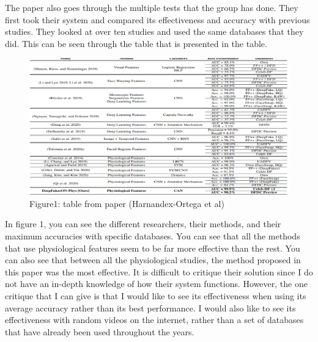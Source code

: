 \documentclass[12pt,journal,compsoc]{IEEEtran}
\begin{document}
The paper also goes through the multiple tests that the group has done. They first took their system and compared its effectiveness and accuracy with previous studies. They looked at over ten studies and used the same databases that they did. This can be seen through the table that is presented in the table.
\begin{figure}[!h]
  \includegraphics[scale=0.45]{image.png}
  \caption{Figure1: table from paper (Harnandex-Ortega et al)}
  \label{fig:slugman}
\end{figure}
In figure 1, you can see the different researchers, their methods, and their maximum accuracies with specific databases. You can see that all the methods that use physiological features seem to be far more effective than the rest. You can also see that between all the physiological studies, the method proposed in this paper was the most effective. It is difficult to critique their solution since I do not have an in-depth knowledge of how their system functions. However, the one critique that I can give is that I would like to see its effectiveness when using its average accuracy rather than its best performance. I would also like to see its effectiveness with random videos on the internet, rather than a set of databases that have already been used throughout the years.
\newpage
\end{document}
